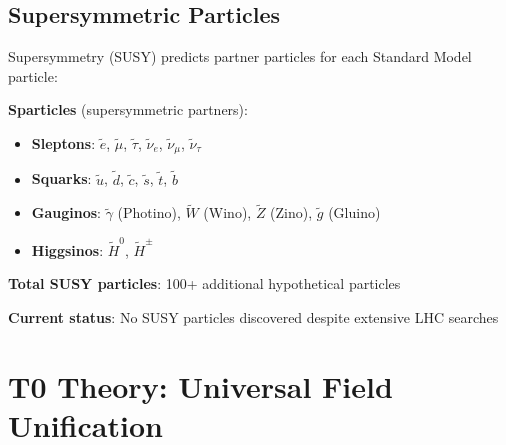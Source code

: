 	\begin{table}[htbp]
		\centering
		\caption{Hypothetical Particles Beyond the Standard Model}
		\label{tab:hypothetical_particles}
	\end{table}
	
	\subsection{Supersymmetric Particles}
	
	Supersymmetry (SUSY) predicts partner particles for each Standard Model particle:
	
	\textbf{Sparticles} (supersymmetric partners):
	\begin{itemize}
		\item \textbf{Sleptons}: $\tilde{e}$, $\tilde{\mu}$, $\tilde{\tau}$, $\tilde{\nu}_e$, $\tilde{\nu}_\mu$, $\tilde{\nu}_\tau$
		\item \textbf{Squarks}: $\tilde{u}$, $\tilde{d}$, $\tilde{c}$, $\tilde{s}$, $\tilde{t}$, $\tilde{b}$
		\item \textbf{Gauginos}: $\tilde{\gamma}$ (Photino), $\tilde{W}$ (Wino), $\tilde{Z}$ (Zino), $\tilde{g}$ (Gluino)
		\item \textbf{Higgsinos}: $\tilde{H}^0$, $\tilde{H}^{\pm}$
	\end{itemize}
	
	\textbf{Total SUSY particles}: 100+ additional hypothetical particles
	
	\textbf{Current status}: No SUSY particles discovered despite extensive LHC searches
	
	\section{T0 Theory: Universal Field Unification}
	
